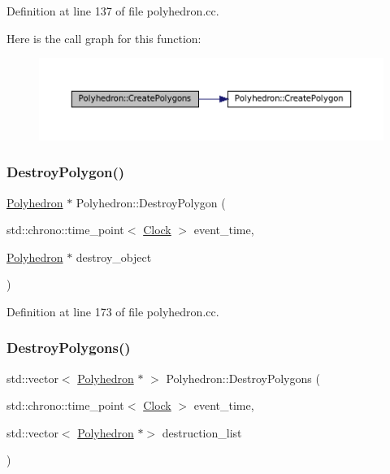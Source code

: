 Definition at line 137 of file polyhedron.\+cc.

Here is the call graph for this function\+:\nopagebreak
\begin{figure}[H]
\begin{center}
\leavevmode
\includegraphics[width=350pt]{class_polyhedron_a1848eb8747c1132c40c2d27336af2896_cgraph}
\end{center}
\end{figure}
\mbox{\label{class_polyhedron_a2fcc5144ebc64363f40c31d2b980cfaf}} 
\subsubsection{\texorpdfstring{Destroy\+Polygon()}{DestroyPolygon()}}
{\footnotesize\ttfamily \mbox{\hyperlink{class_polyhedron}{Polyhedron}} $\ast$ Polyhedron\+::\+Destroy\+Polygon (\begin{DoxyParamCaption}\item[{std\+::chrono\+::time\+\_\+point$<$ \mbox{\hyperlink{universe_8h_a0ef8d951d1ca5ab3cfaf7ab4c7a6fd80}{Clock}} $>$}]{event\+\_\+time,  }\item[{\mbox{\hyperlink{class_polyhedron}{Polyhedron}} $\ast$}]{destroy\+\_\+object }\end{DoxyParamCaption})}



Definition at line 173 of file polyhedron.\+cc.

\mbox{\label{class_polyhedron_ae372d216765d48b9423ee37a8bf8b282}} 
\subsubsection{\texorpdfstring{Destroy\+Polygons()}{DestroyPolygons()}}
{\footnotesize\ttfamily std\+::vector$<$ \mbox{\hyperlink{class_polyhedron}{Polyhedron}} $\ast$ $>$ Polyhedron\+::\+Destroy\+Polygons (\begin{DoxyParamCaption}\item[{std\+::chrono\+::time\+\_\+point$<$ \mbox{\hyperlink{universe_8h_a0ef8d951d1ca5ab3cfaf7ab4c7a6fd80}{Clock}} $>$}]{event\+\_\+time,  }\item[{std\+::vector$<$ \mbox{\hyperlink{class_polyhedron}{Polyhedron}} $\ast$$>$}]{destruction\+\_\+list }\end{DoxyParamCaption})}




